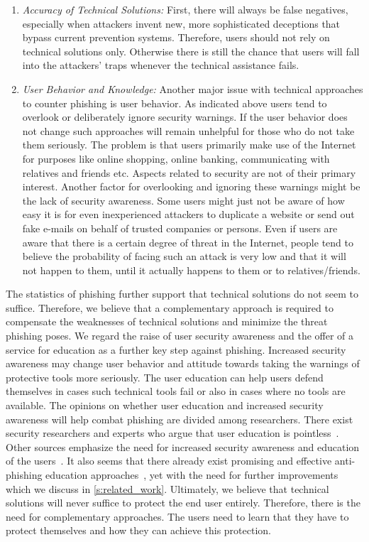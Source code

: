\begin{enumerate}
	\item\textit{Accuracy of Technical Solutions:} 
First, there will always be false negatives, especially when attackers invent new, more sophisticated deceptions that bypass current prevention systems.
Therefore, users should not rely on technical solutions only. 
Otherwise there is still the chance that users will fall into the attackers' traps whenever the technical assistance fails.
	\item\textit{User Behavior and Knowledge:} Another major issue with technical approaches to counter phishing is user behavior.
 As indicated above users tend to overlook or deliberately ignore security warnings.
 If the user behavior does not change such approaches will remain unhelpful for those who do not take them seriously.
 The problem is that users primarily make use of the Internet for purposes like online shopping, online banking, communicating with relatives and friends etc.
 Aspects related to security are not of their primary interest.
 Another factor for overlooking and ignoring these warnings might be the lack of security awareness.
 Some users might just not be aware of how easy it is for even inexperienced attackers to duplicate a website or send out fake e-mails on behalf of trusted companies or persons.
 Even if users are aware that there is a certain degree of threat in the Internet, people tend to believe the probability of facing such an attack is very low and that it will not happen to them, until it actually happens to them or to relatives/friends.
\end{enumerate}

The statistics of phishing further support that technical solutions do not seem to suffice.
Therefore, we believe that a complementary approach is required to compensate the weaknesses of technical solutions and minimize the threat phishing poses.
We regard the raise of user security awareness and the offer of a service for education as a further key step against phishing.
Increased security awareness may change user behavior and attitude towards taking the warnings of protective tools more seriously.
The user education can help users defend themselves in cases such technical tools fail or also in cases where no tools are available.
The opinions on whether user education and increased security awareness will help combat phishing are divided among researchers.
There exist security researchers and experts who argue that user education is pointless~\cite{useredupointless, bruceschneieronsecuritytraining}.
Other sources emphasize the need for increased security awareness and education of the users~\cite{usereducebit, usereduscmagazine}.
It also seems that there already exist promising and effective anti-phishing education approaches~\cite{kumaraguru2007protecting, sheng2007antiphishingphil}, yet with the need for further improvements which we discuss in \autoref{s:related_work}.
Ultimately, we believe that technical solutions will never suffice to protect the end user entirely.
Therefore, there is the need for complementary approaches.
The users need to learn that they have to protect themselves and how they can achieve this protection.
 
